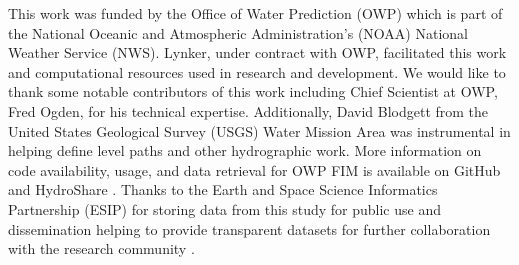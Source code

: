\acknowledgments
%
This work was funded by the Office of Water Prediction (OWP) which is part of the National Oceanic and Atmospheric Administration's (NOAA) National Weather Service (NWS).
Lynker, under contract with OWP, facilitated this work and computational resources used in research and development.
We would like to thank some notable contributors of this work including Chief Scientist at OWP, Fred Ogden, for his technical expertise.
Additionally, David Blodgett from the United States Geological Survey (USGS) Water Mission Area was instrumental in helping define level paths and other hydrographic work.
More information on code availability, usage, and data retrieval for OWP FIM is available on GitHub and HydroShare \cite{inundationMapping2022,imHS2023}.
Thanks to the Earth and Space Science Informatics Partnership (ESIP) for storing data from this study for public use and dissemination helping to provide transparent datasets for further collaboration with the research community \cite{esipData2022}.
